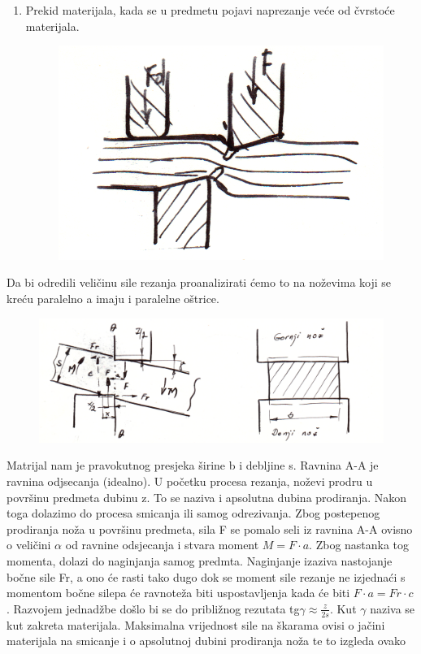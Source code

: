 \documentclass[a4paper,12pt]{article}
\numberwithin{figure}{section}
\begin{document}
\begin{enumerate}
\begin{figure}[!h]
\end{figure}
\FloatBarrier
\item Prekid materijala, kada se u predmetu pojavi naprezanje veće od čvrstoće materijala. 
\begin{figure}[!h]
\centering
\includegraphics[scale=0.15]{image_53-3.png}
\end{figure}
\FloatBarrier
\end{enumerate}
Da bi odredili veličinu sile rezanja proanalizirati ćemo to na noževima koji se kreću paralelno a imaju i paralelne oštrice.
\begin{figure}[!h]
\centering
\includegraphics[scale=0.15]{image_53-4.png}
\end{figure}
\FloatBarrier
Matrijal nam je pravokutnog presjeka širine b i debljine s. Ravnina A-A je ravnina odjsecanja (idealno). U početku procesa rezanja, noževi prodru u površinu predmeta dubinu z. To se naziva i apsolutna dubina prodiranja. Nakon toga dolazimo do procesa smicanja ili samog odrezivanja. Zbog postepenog prodiranja noža u površinu predmeta, sila F se pomalo seli iz ravnina A-A ovisno o veličini $\alpha$ od ravnine odsjecanja i stvara moment $M = F \cdot a$. Zbog nastanka tog momenta, dolazi do naginjanja samog predmta. Naginjanje izaziva nastojanje bočne sile Fr, a ono će rasti tako dugo dok se moment sile rezanje ne izjednaći s momentom bočne silepa će ravnoteža biti uspostavljenja kada će biti $F\cdot a = Fr \cdot c$. Razvojem jednadžbe došlo bi se do približnog rezutata tg$\gamma\approx\frac{z}{2 s}$. Kut $\gamma$ naziva se kut zakreta materijala. Maksimalna vrijednost sile na škarama ovisi o jačini materijala na smicanje i o apsolutnoj dubini prodiranja noža te to izgleda ovako
\end{document}
